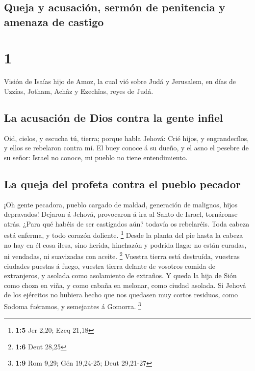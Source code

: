 \hypertarget{queja-y-acusaciuxf3n-sermuxf3n-de-penitencia-y-amenaza-de-castigo}{%
\subsection{Queja y acusación, sermón de penitencia y amenaza de
castigo}\label{queja-y-acusaciuxf3n-sermuxf3n-de-penitencia-y-amenaza-de-castigo}}

\hypertarget{section}{%
\section{1}\label{section}}

 Visión de Isaías hijo de Amoz, la cual vió sobre Judá y
Jerusalem, en días de Uzzías, Jotham, Achâz y Ezechîas, reyes de Judá.

\hypertarget{la-acusaciuxf3n-de-dios-contra-la-gente-infiel}{%
\subsection{La acusación de Dios contra la gente
infiel}\label{la-acusaciuxf3n-de-dios-contra-la-gente-infiel}}

 Oid, cielos, y escucha tú, tierra; porque habla Jehová:
Crié hijos, y engrandecílos, y ellos se rebelaron contra mí.
 El buey conoce á su dueño, y el asno el pesebre de su
señor: Israel no conoce, mi pueblo no tiene entendimiento.

\hypertarget{la-queja-del-profeta-contra-el-pueblo-pecador}{%
\subsection{La queja del profeta contra el pueblo
pecador}\label{la-queja-del-profeta-contra-el-pueblo-pecador}}

 ¡Oh gente pecadora, pueblo cargado de maldad, generación de
malignos, hijos depravados! Dejaron á Jehová, provocaron á ira al Santo
de Israel, tornáronse atrás.  ¿Para qué habéis de ser
castigados aún? todavía os rebelaréis. Toda cabeza está enferma, y todo
corazón doliente. \footnote{\textbf{1:5} Jer 2,20; Ezeq 21,18}
 Desde la planta del pie hasta la cabeza no hay en él cosa
ilesa, sino herida, hinchazón y podrida llaga: no están curadas, ni
vendadas, ni suavizadas con aceite. \footnote{\textbf{1:6} Deut 28,25}
 Vuestra tierra está destruída, vuestras ciudades puestas á
fuego, vuestra tierra delante de vosotros comida de extranjeros, y
asolada como asolamiento de extraños.  Y queda la hija de
Sión como choza en viña, y como cabaña en melonar, como ciudad asolada.
 Si Jehová de los ejércitos no hubiera hecho que nos
quedasen muy cortos residuos, como Sodoma fuéramos, y semejantes á
Gomorra. \footnote{\textbf{1:9} Rom 9,29; Gén 19,24-25; Deut 29,21-27}

